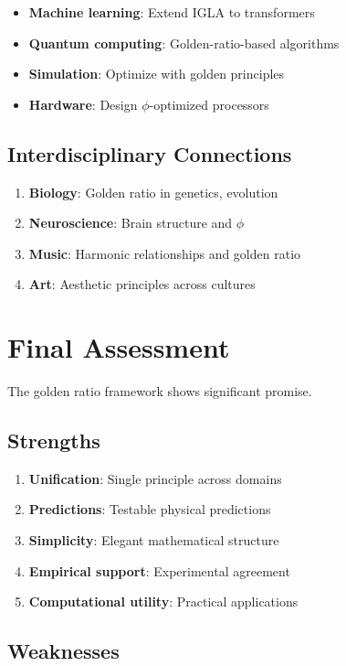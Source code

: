 \begin{itemize}
    \item \textbf{Machine learning}: Extend IGLA to transformers
    \item \textbf{Quantum computing}: Golden-ratio-based algorithms
    \item \textbf{Simulation}: Optimize with golden principles
    \item \textbf{Hardware}: Design $\phi$-optimized processors
\end{itemize}

\subsection{Interdisciplinary Connections}

\begin{enumerate}
    \item \textbf{Biology}: Golden ratio in genetics, evolution
    \item \textbf{Neuroscience}: Brain structure and $\phi$
    \item \textbf{Music}: Harmonic relationships and golden ratio
    \item \textbf{Art}: Aesthetic principles across cultures
\end{enumerate}

\section{Final Assessment}

The golden ratio framework shows significant promise.

\subsection{Strengths}

\begin{enumerate}
    \item \textbf{Unification}: Single principle across domains
    \item \textbf{Predictions}: Testable physical predictions
    \item \textbf{Simplicity}: Elegant mathematical structure
    \item \textbf{Empirical support}: Experimental agreement
    \item \textbf{Computational utility}: Practical applications
\end{enumerate}

\subsection{Weaknesses}

